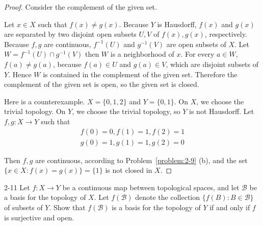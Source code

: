 \begin{proof}
	Consider the complement of the given set.

	Let $x\in X$ such that $f(x)\ne g(x)$. Because $Y$ is Hausdorff, $f(x)$ and $g(x)$ are separated by two disjoint open subsets $U, V$ of $f(x), g(x)$, respectively. Because $f, g$ are continuous, $f^{-1}(U)$ and $g^{-1}(V)$ are open subsets of $X$. Let $W = f^{-1}(U)\cap g^{-1}(V)$ then $W$ is a neighborhood of $x$. For every $a\in W$, $f(a)\ne g(a)$, because $f(a)\in U$ and $g(a)\in V$, which are disjoint subsets of $Y$. Hence $W$ is contained in the complement of the given set. Therefore the complement of the given set is open, so the given set is closed.

	Here is a counterexample. $X = \{ 0, 1, 2 \}$ and $Y = \{ 0, 1 \}$. On $X$, we choose the trivial topology. On $Y$, we choose the trivial topology, so $Y$ is not Hausdorff. Let $f, g: X\to Y$ such that
	\[
		\begin{split}
			f(0) = 0, f(1) = 1, f(2) = 1 \\
			g(0) = 1, g(1) = 1, g(2) = 0
		\end{split}
	\]

	Then $f, g$ are continuous, according to Problem~\ref{problem:2-9} (b), and the set $\{ x\in X : f(x) = g(x) \} = \{ 1 \}$ is not closed in $X$.
\end{proof}

\begin{problem}{2-11}
Let $f: X\to Y$ be a continuous map between topological spaces, and let $\mathscr{B}$ be a basis for the topology of $X$. Let $f(\mathscr{B})$ denote the collection $\{ f(B) : B\in\mathscr{B} \}$ of subsets of $Y$. Show that $f(\mathscr{B})$ is a basis for the topology of $Y$ if and only if $f$ is surjective and open.
\end{problem}

